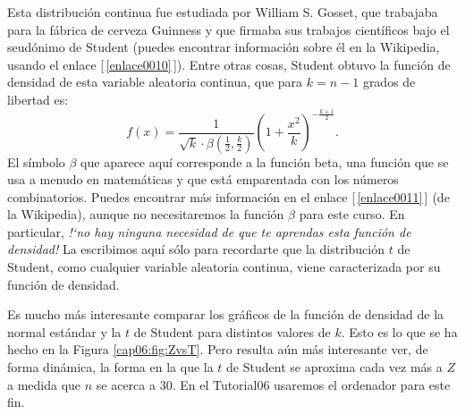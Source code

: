     \begin{center}
    \end{center}
Esta distribución continua fue estudiada por William S. Gosset, que trabajaba para la fábrica de
cerveza Guinness y que firmaba sus trabajos científicos bajo el seudónimo de Student (puedes
encontrar información sobre él en la Wikipedia, usando el enlace [\,\ref{enlace0010}\,]\label{enlace0010a}).
Entre otras cosas, Student obtuvo la función de densidad de esta variable aleatoria continua, que
para $k=n-1$ grados de libertad es:
    \[f(x)=\dfrac{1}{\sqrt{k}\cdot\beta(\frac{1}{2},\frac{k}{2})}\left(1+\dfrac{x^2}{k}\right)^{-\frac{k+1}{2}}.\]
El símbolo $\beta$ que aparece aquí corresponde a la función beta, una función que se usa a menudo
en matemáticas y que está emparentada con los números combinatorios. Puedes encontrar más información en el enlace [\,\ref{enlace0011}\,]\label{enlace0011a} (de la Wikipedia), aunque no
necesitaremos la función $\beta$ para este curso. En particular, {\em {!`}no hay ninguna necesidad de que te aprendas esta función de densidad!} La escribimos aquí sólo para recordarte que la distribución $t$ de
Student, como cualquier variable aleatoria continua, viene caracterizada por su función de
densidad.

Es mucho más interesante comparar los gráficos de la función de densidad de la
normal estándar y la $t$ de Student para distintos valores de $k$. Esto es lo
que se ha hecho en la Figura \ref{cap06:fig:ZvsT}. Pero resulta aún más
interesante ver, de forma dinámica, la forma en la que la $t$ de Student se
aproxima cada vez más a $Z$ a medida que $n$ se acerca a 30. En el Tutorial06 usaremos el ordenador para este fin.

